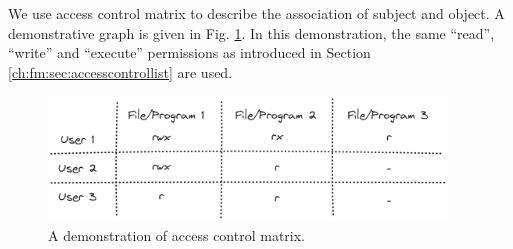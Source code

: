 We use access control matrix to describe the association of subject and object. A demonstrative graph is given in Fig. \ref{ch:ossec:fig:acmatrix}. In this demonstration, the same ``read'', ``write'' and ``execute'' permissions as introduced in Section \ref{ch:fm:sec:accesscontrollist} are used.

\begin{figure}[htbp]
	\centering
	\includegraphics[width=300pt]{chapters/ch-computer-security-basics/figures/acmatrix.png}
	\caption{A demonstration of access control matrix.} \label{ch:ossec:fig:acmatrix}
\end{figure}















